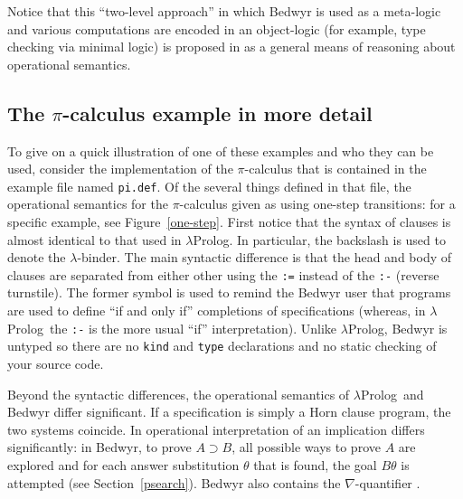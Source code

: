 \documentclass{article}
\newcommand{\lp}{$\lambda$Prolog}
\begin{document}
Notice that this ``two-level approach'' in which Bedwyr is used as a
meta-logic and various computations are encoded in an object-logic
(for example, type checking via minimal logic) is proposed in
\cite{miller06ijcar} as a general means of reasoning about operational
semantics.

\subsection{The $\pi$-calculus example in more detail}

To give on a quick illustration of one of these examples and who they
can be used, consider the implementation of the $\pi$-calculus that is
contained in the example file named \verb+pi.def+.  Of the several
things defined in that file, the operational semantics for the
$\pi$-calculus given as using one-step transitions: for a specific
example, see Figure~\ref{one-step}.  First notice that the syntax of
clauses is almost identical to that used in $\lambda$Prolog.  In
particular, the backslash is used to denote the $\lambda$-binder.  The
main syntactic difference is that the head and body of clauses are
separated from either other using the \verb+:=+ instead of the
\verb+:-+ (reverse turnstile).  The former symbol is used to remind
the Bedwyr user that programs are used to define ``if and only if''
completions of specifications (whereas, in \lp\ the \verb+:-+ is the
more usual ``if'' interpretation).  Unlike \lp, Bedwyr is
untyped so there are no {\tt kind} and {\tt type} declarations and no
static checking of your source code.  

Beyond the syntactic differences, the operational semantics of \lp\
and Bedwyr differ significant.  If a specification is simply a Horn
clause program, the two systems coincide.  In operational
interpretation of an implication differs significantly: in Bedwyr, to
prove $A\supset B$, all possible ways to prove $A$ are explored and
for each answer substitution $\theta$ that is found, the goal
$B\theta$ is attempted (see Section~\ref{psearch}).  Bedwyr also
contains the $\nabla$-quantifier \cite{miller05tocl}. 
\end{document}

